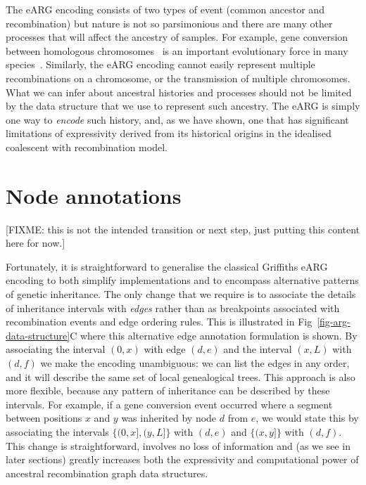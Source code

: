 \documentclass{article}
\begin{document}
The eARG encoding consists of two types of event
(common ancestor and recombination) but nature is not so parsimonious
and there are many other processes that will affect the
ancestry of samples.
For example, gene conversion between homologous
chromosomes~\citep{wiuf2000coalescent,chen2007gene} is an important
evolutionary force in many species~\cite[e.g.][]{yang2012great}.
Similarly, the eARG encoding cannot easily represent multiple
recombinations on a chromosome, or the transmission of multiple
chromosomes.
What we can infer about ancestral histories and
processes should not be limited by the data structure that we
use to represent such ancestry. The eARG is simply one way
to \emph{encode} such history, and, as we have shown,
one that has significant limitations of expressivity
derived from its historical origins in the idealised
coalescent with recombination model.


\section*{Node annotations}
[FIXME: this is not the intended transition or next step, just putting this
content here for now.]

Fortunately, it is straightforward to generalise the classical Griffiths
eARG encoding to both simplify implementations and to encompass
alternative patterns of genetic inheritance.
The only change that we require is to associate
the details of inheritance intervals with \emph{edges} rather than
as breakpoints associated with recombination events and
edge ordering rules. This is illustrated in Fig~\ref{fig-arg-data-structure}C
where this alternative edge annotation formulation is
shown. By associating the interval $(0, x)$ with edge $(d,e)$
and the interval $(x, L)$ with $(d, f)$ we make the encoding
unambiguous: we can list the edges in any order, and it
will describe the same set of local genealogical trees.
This approach is also more flexible, because any pattern
of inheritance can be described by these intervals. For
example, if a gene conversion event occurred where a segment
between positions $x$ and $y$ was inherited by
node $d$ from $e$, we would state this by associating
the intervals $\{(0, x], (y, L]\}$ with $(d,e)$ and
$\{(x, y]\}$ with $(d,f)$.
This change is straightforward, involves no loss of information
and (as we see in later sections)
greatly increases both the expressivity and computational
power of ancestral recombination graph data structures.
\end{document}

